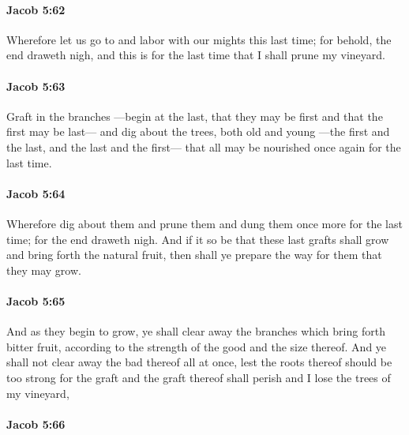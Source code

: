 		\paragraph{Jacob 5:62} %
			\label{JACOB-5-62}

			Wherefore let us go to and labor with our mights this last time;
			for behold, the end draweth nigh,
			and this is for the last time that I shall prune my vineyard.

		\paragraph{Jacob 5:63} %
			\label{JACOB-5-63}

			Graft in the branches
			---begin at the last, that they may be first and that the first may be last---
			and dig about the trees, both old and young
			---the first and the last, and the last and the first---
			that all may be nourished once again for the last time.

		\paragraph{Jacob 5:64} %
			\label{JACOB-5-64}

			Wherefore dig about them and prune them
			and dung them once more for the last time;
			for the end draweth nigh.
			And if it so be that these last grafts shall grow and bring forth the natural fruit,
			then shall ye prepare the way for them that they may grow.

		\paragraph{Jacob 5:65} %
			\label{JACOB-5-65}

			And as they begin to grow,
			ye shall clear away the branches which bring forth bitter fruit,
			according to the strength of the good and the size thereof.
			And ye shall not clear away the bad thereof all at once,
			lest the roots thereof should be too strong for the graft
			and the graft thereof shall perish and I lose the trees of my vineyard,

		\paragraph{Jacob 5:66} %
			\label{JACOB-5-66}


